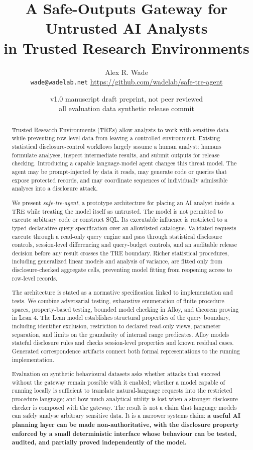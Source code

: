 \documentclass[11pt,a4paper]{article}
\title{A Safe-Outputs Gateway for Untrusted AI Analysts\\in Trusted Research Environments}
\author{Alex R. Wade\\\small\texttt{wade@wadelab.net} \;\textperiodcentered\;
  \small\url{https://github.com/wadelab/safe-tre-agent}}
\date{\small v1.0 manuscript draft \;\textperiodcentered\; preprint, not peer reviewed \\
\small all evaluation data synthetic \;\textperiodcentered\; release commit \VOneCommit}
\begin{document}
\maketitle

\begin{abstract}
Trusted Research Environments (TREs) allow analysts to work with sensitive data
while preventing row-level data from leaving a controlled environment. Existing
statistical disclosure-control workflows largely assume a human analyst: humans
formulate analyses, inspect intermediate results, and submit outputs for release
checking. Introducing a capable language-model agent changes this threat model.
The agent may be prompt-injected by data it reads, may generate code or queries
that expose protected records, and may coordinate sequences of individually
admissible analyses into a disclosure attack.

We present \textit{safe-tre-agent}, a prototype architecture for placing an AI
analyst inside a TRE while treating the model itself as untrusted. The model is
not permitted to execute arbitrary code or construct SQL. Its executable
influence is restricted to a typed declarative query specification over an
allowlisted catalogue. Validated requests execute through a read-only query
engine and pass through statistical disclosure controls, session-level
differencing and query-budget controls, and an auditable release decision before
any result crosses the TRE boundary. Richer statistical procedures, including
generalized linear models and analysis of variance, are fitted only from
disclosure-checked aggregate cells, preventing model fitting from reopening
access to row-level records.

The architecture is stated as a normative specification linked to implementation
and tests. We combine adversarial testing, exhaustive enumeration of finite
procedure spaces, property-based testing, bounded model checking in Alloy, and
theorem proving in Lean 4. The Lean model establishes structural properties of
the query boundary, including identifier exclusion, restriction to declared
read-only views, parameter separation, and limits on the granularity of internal
range predicates. Alloy models stateful disclosure rules and checks
session-level properties and known residual cases. Generated correspondence
artifacts connect both formal representations to the running implementation.

Evaluation on synthetic behavioural datasets asks whether attacks that succeed
without the gateway remain possible with it enabled; whether a model capable of
running locally is sufficient to translate natural-language requests into the
restricted procedure language; and how much analytical utility is lost when a
stronger disclosure checker is composed with the gateway. The result is not a
claim that language models can safely analyse arbitrary sensitive data. It is a
narrower systems claim: \textbf{a useful AI planning layer can be made
non-authoritative, with the disclosure property enforced by a small
deterministic interface whose behaviour can be tested, audited, and partially
proved independently of the model.}
\end{abstract}
\end{document}
